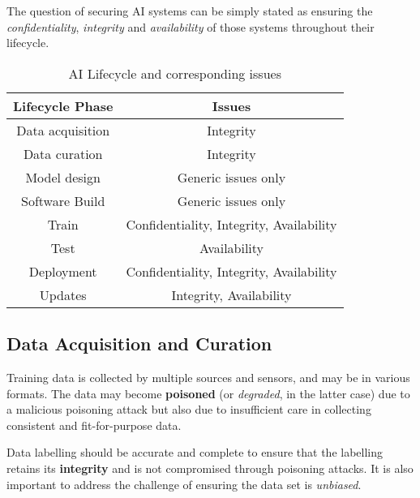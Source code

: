 The question of securing AI systems can be simply stated as ensuring the \textit{confidentiality}, \textit{integrity} and \textit{availability} of those systems throughout their lifecycle.
\begin{table}[htbp]
   \centering
   \begin{tabular}{|c|c|}
      \toprule
      \textbf{Lifecycle Phase} & \textbf{Issues}\\
      \hline
      Data acquisition & {\color{red}Integrity}\\
      \hline
      Data curation & {\color{red}Integrity}\\
      \hline
      Model design & Generic issues only \\
      \hline
      Software Build & Generic issues only\\
      \hline
      Train & {\color{blue}Confidentiality}, {\color{red}Integrity}, {\color{green}Availability}\\
      \hline
      Test & {\color{green}Availability}\\
      \hline
      Deployment & {\color{blue}Confidentiality}, {\color{red}Integrity}, {\color{green}Availability}\\
      \hline
      Updates & {\color{red}Integrity}, {\color{green}Availability}\\
      \hline
   \end{tabular}
   \caption{AI Lifecycle and corresponding issues}
   \label{tab:ailifecycle_issues}
\end{table}

\subsection{Data Acquisition and Curation}
Training data is collected by multiple sources and sensors, and may be in various formats.
The data may become \textbf{poisoned} (or \textit{degraded}, in the latter case) due to a malicious poisoning attack but also due to insufficient care in collecting consistent and fit-for-purpose data.

\begin{paracol}{2}
   \colfill
{}
\colfill
\switchcolumn
\colfill
Data labelling should be accurate and complete to ensure that the labelling retains its \textbf{integrity} and is not compromised through poisoning attacks.
It is also important to address the challenge of ensuring the data set is
\textit{unbiased}.
\colfill
\end{paracol}

